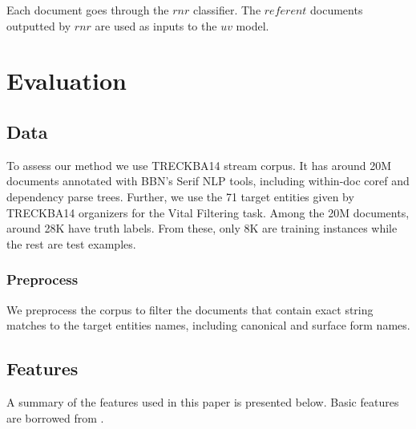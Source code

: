 \documentclass{article}
\begin{document}
Each document goes through the $rnr$ classifier. The $referent$ documents outputted by $rnr$ are used as inputs to the $uv$ model.

\section{Evaluation}
\label{evaluation}

\subsection{Data}

To assess our method we use TRECKBA14 stream corpus. It has around 20M documents annotated with BBN's Serif NLP tools, including within-doc coref and dependency parse trees. Further, we use the 71 target entities given by TRECKBA14 organizers for the Vital Filtering task. Among the 20M documents, around 28K have truth labels. From these, only 8K are training instances while the rest are test examples.

\subsubsection{Preprocess}

We preprocess the corpus to filter the documents that contain exact string matches to the target entities names, including canonical and surface form names.

\subsection{Features}
\label{feat}

A summary of the features used in this paper is presented below. Basic features are borrowed from \cite{jingang13}.
\end{document}
